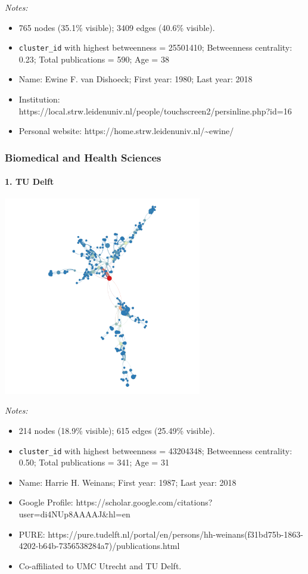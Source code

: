 \documentclass[]{elsarticle} %
\providecommand{\tightlist}{%
  \setlength{\itemsep}{0pt}\setlength{\parskip}{0pt}}
\begin{document}
\emph{Notes:}

\begin{itemize}
\tightlist
\item
  765 nodes (35.1\% visible); 3409 edges (40.6\% visible).
\item
  \texttt{cluster\_id} with highest betweenness = 25501410; Betweenness
  centrality: 0.23; Total publications = 590; Age = 38
\item
  Name: Ewine F. van Dishoeck; First year: 1980; Last year: 2018
\item
  Institution:
  https://local.strw.leidenuniv.nl/people/touchscreen2/persinline.php?id=16
\item
  Personal website:
  https://home.strw.leidenuniv.nl/\textasciitilde{}ewine/
\end{itemize}

\hypertarget{biomedical-and-health-sciences}{%
\subsubsection{Biomedical and Health
Sciences}\label{biomedical-and-health-sciences}}

\hypertarget{tu-delft-1}{%
\paragraph{1. TU Delft}\label{tu-delft-1}}

\includegraphics[width=3.41in]{figs/tu_bio_betweenness}

\emph{Notes:}

\begin{itemize}
\tightlist
\item
  214 nodes (18.9\% visible); 615 edges (25.49\% visible).
\item
  \texttt{cluster\_id} with highest betweenness = 43204348; Betweenness
  centrality: 0.50; Total publications = 341; Age = 31
\item
  Name: Harrie H. Weinans; First year: 1987; Last year: 2018
\item
  Google Profile:
  https://scholar.google.com/citations?user=di4NUp8AAAAJ\&hl=en
\item
  PURE:
  https://pure.tudelft.nl/portal/en/persons/hh-weinans(f31bd75b-1863-4202-b64b-7356538284a7)/publications.html
\item
  Co-affiliated to UMC Utrecht and TU Delft.
\end{itemize}
\end{document}
